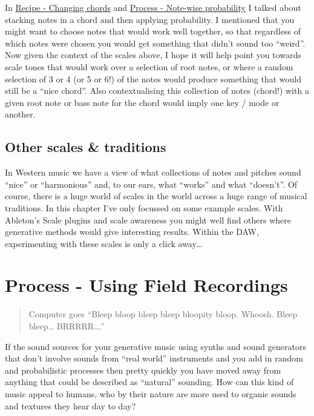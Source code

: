 \documentclass[
  12pt,
  letterpaper,
  oneside,
  open=any]{scrbook}
\begin{document}
In \hyperref[Chapter-001-Recipe-Changing_Chords]{Recipe - Changing
chords} and \hyperref[Chapter-002-Process-Note_wise_probability]{Process
- Note-wise probability} I talked about stacking notes in a chord and
then applying probability. I mentioned that you might want to choose
notes that would work well together, so that regardless of which notes
were chosen you would get something that didn't sound too ``weird''. Now
given the context of the scales above, I hope it will help point you
towards scale tones that would work over a selection of root notes, or
where a random selection of 3 or 4 (or 5 or 6!) of the notes would
produce something that would still be a ``nice chord''. Also
contextualising this collection of notes (chord!) with a given root note
or bass note for the chord would imply one key / mode or another.

\section{Other scales \& traditions}\label{other-scales-traditions}

In Western music we have a view of what collections of notes and pitches
sound ``nice'' or ``harmonious'' and, to our ears, what ``works'' and
what ``doesn't''. Of course, there is a huge world of scales in the
world across a huge range of musical traditions. In this chapter I've
only focussed on some example scales. With Ableton's Scale plugins and
scale awareness you might well find others where generative methods
would give interesting results. Within the DAW, experimenting with these
scales is only a click away\ldots{}


\chapter{Process - Using Field
Recordings}\label{Chapter-019-Process-Using_Field_Recordings}

\begin{quote}
Computer goes ``Bleep bloop bleep bleep bloopity bloop. Whoosh. Bleep
bleep\ldots{} BRRRRR\ldots.''
\end{quote}

If the sound sources for your generative music using synths and sound
generators that don't involve sounds from ``real world'' instruments and
you add in random and probabilistic processes then pretty quickly you
have moved away from anything that could be described as ``natural''
sounding. How can this kind of music appeal to humans, who by their
nature are more used to organic sounds and textures they hear day to
day?
\end{document}
